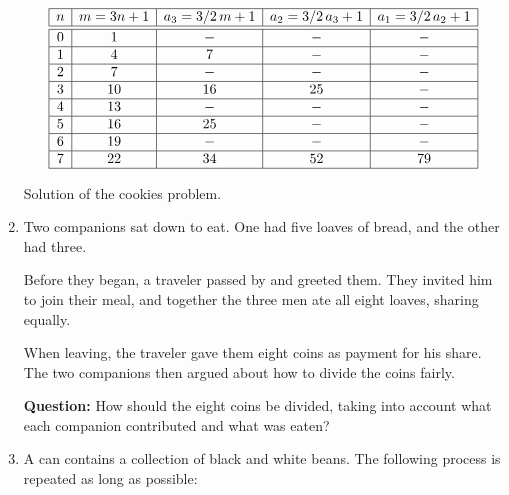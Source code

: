 \begin{enumerate}
{\begin{table}[!htb]
	\centering
	$$
	\begin{array}{|c|c|c|c|c|}
		\hline
		n & m = 3n+1 & a_3 = 3/2 \, m + 1 & a_2 = 3/2 \, a_3 + 1 & a_1 = 3/2 \, a_2 + 1 \\ \hline \hline
		 0  &  1  &  -  &  -  &  -  \\ \hline
		 1  &  4  &  7  &  -  &  -  \\ \hline
		 2  &  7  &  -  &  -  &  -  \\ \hline
		 3  & 10  & 16  & 25  &  -  \\ \hline
		 4  & 13  &  -  &  -  &  -  \\ \hline
		 5  & 16  & 25  &  -  &  -  \\ \hline
		 6  & 19  &  -  &  -  &  -  \\ \hline
		 7  & 22  & 34  & 52  & 79  \\ \hline
	\end{array}
	$$
\caption{Solution of the cookies problem.}
\label{tab:cookies}
\end{table}

}

\item \streasy Two companions sat down to eat. One had five loaves of bread, and the other had three.

Before they began, a traveler passed by and greeted them. They invited him to join their meal, and together the three men ate all eight loaves, sharing equally.

When leaving, the traveler gave them eight coins as payment for his share. The two companions then argued about how to divide the coins fairly.

{\bf Question:} How should the eight coins be divided, taking into account what each companion contributed and what was eaten?


\item \strhard A can contains a collection of black and white beans. The following process is repeated as long as possible:


\end{enumerate}
